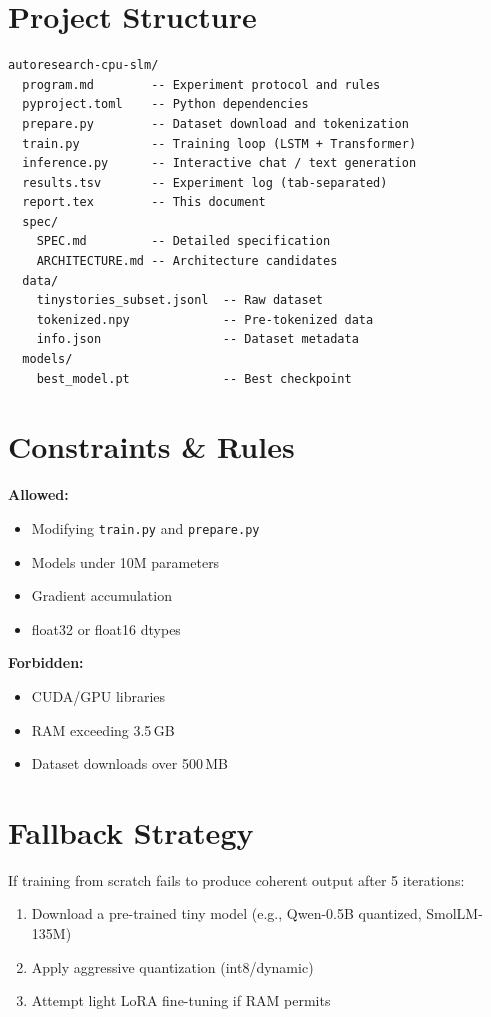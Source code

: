 \documentclass[11pt,a4paper]{article}
\begin{document}
\section{Project Structure}

\begin{lstlisting}
autoresearch-cpu-slm/
  program.md        -- Experiment protocol and rules
  pyproject.toml    -- Python dependencies
  prepare.py        -- Dataset download and tokenization
  train.py          -- Training loop (LSTM + Transformer)
  inference.py      -- Interactive chat / text generation
  results.tsv       -- Experiment log (tab-separated)
  report.tex        -- This document
  spec/
    SPEC.md         -- Detailed specification
    ARCHITECTURE.md -- Architecture candidates
  data/
    tinystories_subset.jsonl  -- Raw dataset
    tokenized.npy             -- Pre-tokenized data
    info.json                 -- Dataset metadata
  models/
    best_model.pt             -- Best checkpoint
\end{lstlisting}

\section{Constraints \& Rules}

\textbf{Allowed:}
\begin{itemize}[nosep]
  \item Modifying \texttt{train.py} and \texttt{prepare.py}
  \item Models under 10M parameters
  \item Gradient accumulation
  \item float32 or float16 dtypes
\end{itemize}

\textbf{Forbidden:}
\begin{itemize}[nosep]
  \item CUDA/GPU libraries
  \item RAM exceeding 3.5\,GB
  \item Dataset downloads over 500\,MB
\end{itemize}

\section{Fallback Strategy}

If training from scratch fails to produce coherent output after 5 iterations:
\begin{enumerate}[nosep]
  \item Download a pre-trained tiny model (e.g., Qwen-0.5B quantized, SmolLM-135M)
  \item Apply aggressive quantization (int8/dynamic)
  \item Attempt light LoRA fine-tuning if RAM permits
\end{enumerate}
\end{document}
